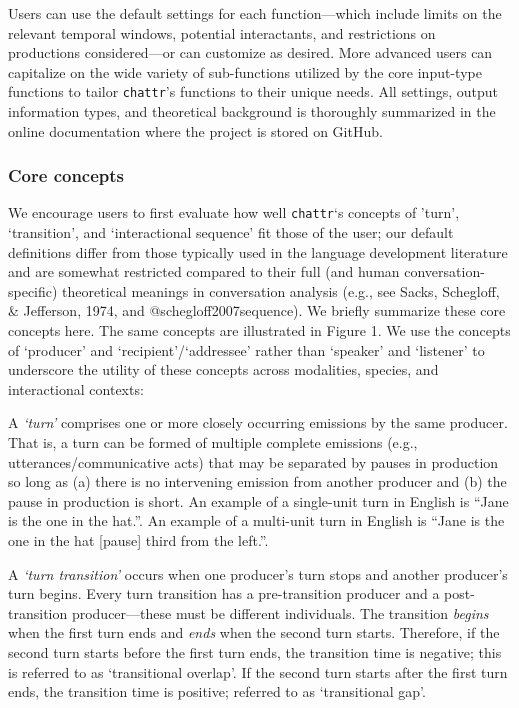 \documentclass[10pt, letterpaper]{article}
\begin{document}
Users can use the default settings for each function---which include
limits on the relevant temporal windows, potential interactants, and
restrictions on productions considered---or can customize as desired.
More advanced users can capitalize on the wide variety of sub-functions
utilized by the core input-type functions to tailor \texttt{chattr}'s
functions to their unique needs. All settings, output information types,
and theoretical background is thoroughly summarized in the online
documentation where the project is stored on GitHub.

\hypertarget{core-concepts}{%
\subsubsection{Core concepts}\label{core-concepts}}

We encourage users to first evaluate how well \texttt{chattr}`s concepts
of 'turn', `transition', and `interactional sequence' fit those of the
user; our default definitions differ from those typically used in the
language development literature and are somewhat restricted compared to
their full (and human conversation-specific) theoretical meanings in
conversation analysis (e.g., see Sacks, Schegloff, \& Jefferson, 1974,
and @schegloff2007sequence). We briefly summarize these core concepts
here. The same concepts are illustrated in Figure 1. We use the concepts
of `producer' and `recipient'/`addressee' rather than `speaker' and
`listener' to underscore the utility of these concepts across
modalities, species, and interactional contexts:

A \emph{`turn'} comprises one or more closely occurring emissions by the
same producer. That is, a turn can be formed of multiple complete
emissions (e.g., utterances/communicative acts) that may be separated by
pauses in production so long as (a) there is no intervening emission
from another producer and (b) the pause in production is short. An
example of a single-unit turn in English is ``Jane is the one in the
hat.''. An example of a multi-unit turn in English is ``Jane is the one
in the hat {[}pause{]} third from the left.''.

A \emph{`turn transition'} occurs when one producer's turn stops and
another producer's turn begins. Every turn transition has a
pre-transition producer and a post-transition producer---these must be
different individuals. The transition \emph{begins} when the first turn
ends and \emph{ends} when the second turn starts. Therefore, if the
second turn starts before the first turn ends, the transition time is
negative; this is referred to as `transitional overlap'. If the second
turn starts after the first turn ends, the transition time is positive;
referred to as `transitional gap'.
\end{document}

